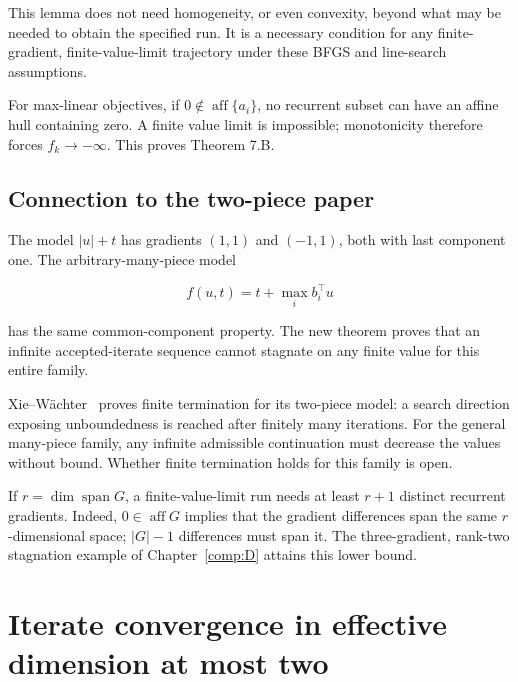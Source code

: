 This lemma does not need homogeneity, or even convexity, beyond what may
be needed to obtain the specified run. It is a necessary condition for
any finite-gradient, finite-value-limit trajectory under these BFGS and
line-search assumptions.

For max-linear objectives, if \(0\notin\operatorname{aff}\{a_i\}\), no
recurrent subset can have an affine hull containing zero. A finite value
limit is impossible; monotonicity therefore forces \(f_k\to-\infty\).
This proves Theorem 7.B.



\subsection{Connection to the two-piece
paper}\label{H:connection-to-the-two-piece-paper}


The model \(|u|+t\) has gradients \((1,1)\) and \((-1,1)\), both with
last component one. The arbitrary-many-piece model

\[
f(u,t)=t+\max_i b_i^\top u
\]

has the same common-component property. The new theorem proves
that an infinite accepted-iterate sequence cannot stagnate on any finite
value for this entire family.

Xie--W\"achter~\cite{XW} proves finite termination
for its two-piece model: a search direction exposing unboundedness is
reached after finitely many iterations. For the general many-piece
family, any infinite admissible continuation must decrease the values
without bound. Whether finite termination holds for this family is open.

If \(r=\dim\operatorname{span}G\), a finite-value-limit run needs at
least \(r+1\) distinct recurrent gradients. Indeed,
\(0\in\operatorname{aff}G\) implies that the gradient differences span
the same \(r\)-dimensional space; \(|G|-1\) differences must span it.
The three-gradient, rank-two stagnation example of Chapter~\ref{comp:D} attains this
lower bound.


\setcounter{section}{6}
\setcounter{theorem}{0}
\setcounter{lemma}{0}
\setcounter{corollary}{0}
\setcounter{proposition}{0}
\setcounter{remark}{0}
\setcounter{equation}{0}


\section{Iterate convergence in effective dimension at most
two}\label{H:iterate-convergence-in-effective-dimension-at-most-two}

